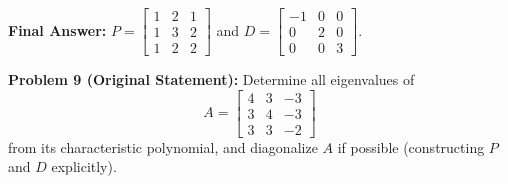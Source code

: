 \documentclass[11pt, letterpaper]{article}
\theoremstyle{definition}
\theoremstyle{remark}
\begin{document}
\textbf{Final Answer:} $P = \begin{bmatrix} 1 & 2 & 1 \\ 1 & 3 & 2 \\ 1 & 2 & 2 \end{bmatrix}$ and $D = \begin{bmatrix} -1 & 0 & 0 \\ 0 & 2 & 0 \\ 0 & 0 & 3 \end{bmatrix}$.

\vspace{0.8em}
\textbf{Problem 9 (Original Statement):}
Determine all eigenvalues of
\[
A = \begin{bmatrix} 4 & 3 & -3 \\ 3 & 4 & -3 \\ 3 & 3 & -2 \end{bmatrix}
\]
from its characteristic polynomial, and diagonalize $A$ if possible (constructing $P$ and $D$ explicitly).
\end{document}
